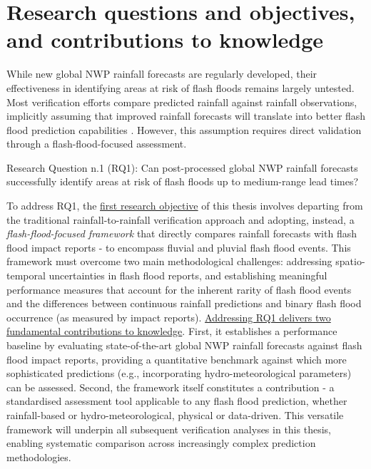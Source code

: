 \section{Research questions and objectives, and contributions to knowledge}
\label{general_introduction_research_questions_objectives_contribution2knowledge}

While  new global NWP rainfall forecasts are regularly developed, their effectiveness in identifying areas at risk of flash floods remains largely untested. Most verification efforts compare predicted rainfall against rainfall observations, implicitly assuming that improved rainfall forecasts will translate into better flash flood prediction capabilities \citep{Gascón_2024}. However, this assumption requires direct validation through a flash-flood-focused assessment. 

\begin{tcolorbox}[
  colframe=colour_chapter5,  
  colback=white,           
  sharp corners,        
  boxrule=2mm,          
  left=0mm,             
  right=0mm,            
  toprule=0mm,          
  bottomrule=0mm,       
  rightrule=2mm        
]
{\color{colour_chapter5} {\setlength{\parindent}{1.0em} Research Question n.1 (RQ1): Can post-processed global NWP rainfall forecasts successfully identify areas at risk of flash floods up to medium-range lead times?}}
\end{tcolorbox}

\noindent To address RQ1, the \uline{first research objective} of this thesis involves departing from the traditional rainfall-to-rainfall verification approach and adopting, instead, a \textit{flash-flood-focused framework} that directly compares rainfall forecasts with flash flood impact reports - to encompass fluvial and pluvial flash flood events. This framework must overcome two main methodological challenges: addressing spatio-temporal uncertainties in flash flood reports, and establishing meaningful performance measures that account for the inherent rarity of flash flood events and the differences between continuous rainfall predictions and binary flash flood occurrence (as measured by impact reports). \uline{Addressing RQ1 delivers two fundamental contributions to knowledge}. First, it establishes a performance baseline by evaluating state-of-the-art global NWP rainfall forecasts against flash flood impact reports, providing a quantitative benchmark against which more sophisticated predictions (e.g., incorporating hydro-meteorological parameters) can be assessed. Second, the framework itself constitutes a contribution - a standardised assessment tool applicable to any flash flood prediction, whether rainfall-based or hydro-meteorological, physical or data-driven. This versatile framework will underpin all subsequent verification analyses in this thesis, enabling systematic comparison across increasingly complex prediction methodologies.

